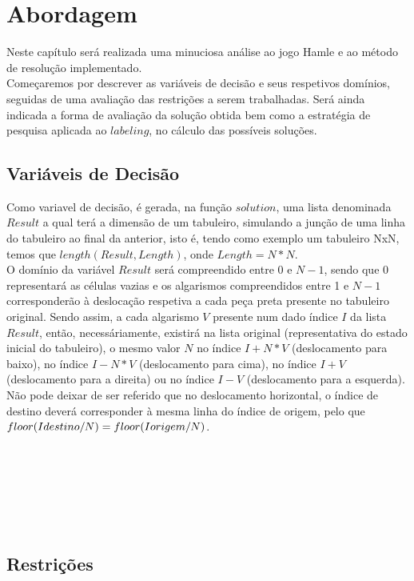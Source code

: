 \chapter{Abordagem}

Neste cap\'itulo ser\'a realizada uma minuciosa an\'alise ao jogo Hamle e ao m\'etodo de resolu\c{c}\~ao implementado. \\
Come\c{c}aremos por descrever as vari\'aveis de decis\~ao e seus respetivos dom\'inios, seguidas de uma avalia\c{c}\~ao das restri\c{c}\~oes a serem trabalhadas. Ser\'a ainda indicada a forma de avalia\c{c}\~ao da solu\c{c}\~ao obtida bem como a estrat\'egia de pesquisa aplicada ao $labeling$, no c\'alculo das poss\'iveis solu\c{c}\~oes.

\section{Vari\'aveis de Decis\~ao}

Como variavel de decis\~ao, \'e gerada, na fun\c{c}\~ao $solution$, uma lista denominada $Result$ a qual ter\'a a dimens\~ao de um tabuleiro, simulando a jun\c{c}\~ao de uma linha do tabuleiro ao final da anterior, isto \'e, tendo como exemplo um tabuleiro NxN, temos que $length(Result, Length)$, onde $Length = N*N$.\\
O dom\'inio da vari\'avel $Result$ ser\'a compreendido entre 0 e $N-1$, sendo que 0 representar\'a as c\'elulas vazias e os algarismos compreendidos entre 1 e $N-1$ corresponder\~ao \`a desloca\c{c}\~ao respetiva a cada pe\c{c}a preta presente no tabuleiro original. Sendo assim, a cada algarismo $V$ presente num dado \'indice $I$ da lista $Result$, ent\~ao, necess\'ariamente, existir\'a na lista original (representativa do estado inicial do tabuleiro), o mesmo valor $N$ no \'indice $I + N*V$ (deslocamento para baixo), no \'indice $I - N*V$ (deslocamento para cima), no \'indice $I + V$ (deslocamento para a direita) ou no \'indice $I - V$ (deslocamento para a esquerda). N\~ao pode deixar de ser referido que no deslocamento horizontal, o \'indice de destino dever\'a corresponder \`a mesma linha do \'indice de origem, pelo que $floor(I\small{destino} / N) = floor(I\small{origem} / N)$.\\ \\ \\ \\ \\ \\ \\ 

\section{Restri\c{c}\~oes}


